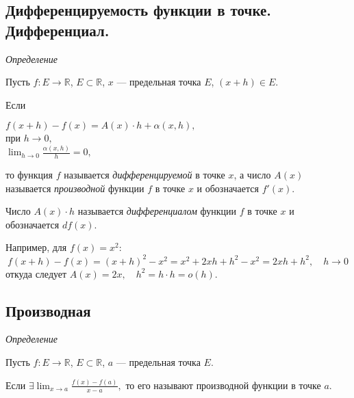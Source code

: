 \vspace{0.5cm}

\subsection{Дифференцируемость функции в точке. Дифференциал.}

\Large{\textit{Определение}}

\begin{center}
    Пусть \( f: E \to \mathbb{R} \), \( E \subset \mathbb{R} \), \( x \) --- предельная точка \( E \), \( (x + h) \in E \).
\end{center}

Если

\begin{center}
    \( f(x+h) - f(x) = A(x) \cdot h + \alpha(x, h), \) \\
    при \( h \to 0, \) \\
    \( \lim_{h \to 0} \frac{\alpha(x, h)}{h} = 0, \)
\end{center}

то функция \( f \) называется \textit{дифференцируемой} в точке \( x \), а число \( A(x) \) называется \textit{производной} функции \( f \) в точке \( x \) и обозначается \( f'(x) \).

\vspace{0.5cm}

Число \( A(x) \cdot h \) называется \textit{дифференциалом} функции \( f \) в точке \( x \) и обозначается \( df(x) \).

\vspace{0.5cm}

Например, для \( f(x) = x^2 \):
\[
f(x+h) - f(x) = (x+h)^2 - x^2 = x^2 + 2xh + h^2 - x^2 = 2xh + h^2, \quad h \to 0
\]
откуда следует \( A(x) = 2x, \quad h^2 = h \cdot h = o(h) \).

\subsection{Производная}

\Large{\textit{Определение}}

\begin{center}
    Пусть \( f: E \to \mathbb{R} \), \( E \subset \mathbb{R} \), \( a \) --- предельная точка \( E \).
\end{center}

Если \( \exists \lim_{x \to a} \frac{f(x) - f(a)}{x-a}, \) то его называют производной функции в точке \( a \).

